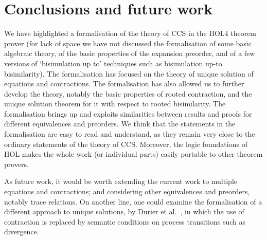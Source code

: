 


\section{Conclusions and future work}
\label{s:concl}

We have highlighted a formalisation of the theory of CCS in the 
HOL4 theorem prover (for lack of space we have not discussed 
the formalisation of some basic algebraic theory, of the basic
properties of the expansion preorder,  and of a few
 versions of `bisimulation up to'
techniques such as  bisimulation up-to bisimilarity). 
The formalisation has focused on the theory of
unique solution of equations and contractions. 
The formalisation has also allowed us to further develop the theory,
notably the basic properties of rooted contraction, and the unique
solution theorem for it with respect to rooted bisimilarity. 
The formalisation brings up and exploits similarities between results
and proofs for different equivalences and preorders. 
We think that the statements in the formalisation are easy to read and
understand, as they remain very close  to  the ordinary  statements of
the theory of CCS. 
Moreover, 
the logic foundations of HOL makes the whole work (or individual
parts) easily portable to other theorem provers.


As future work,  it would be worth extending the current work
to multiple equations and contractions; and considering other equivalences
and preorders, notably trace relations.  
On another line, one could  
examine the formalisation of  a different approach to unique
solutions, by Durier et al.\ \cite{DurierHS17}, in which the use of contraction is
replaced by semantic conditions on process transitions such as
divergence.  



